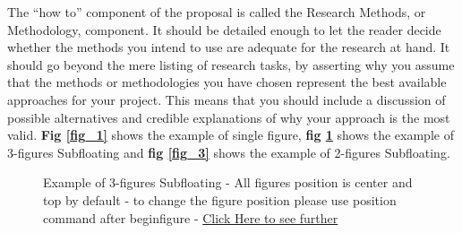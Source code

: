 The “how to” component of the proposal is called the Research Methods, or Methodology, component. It should be detailed enough to let the reader decide whether the methods you intend to use are adequate for the research at hand. It should go beyond the mere listing of research tasks, by asserting why you assume that the methods or methodologies you have chosen represent the best available approaches for your project. This means that you should include a discussion of possible alternatives and credible explanations of why your approach is the most valid. \textbf{Fig \ref{fig_1}} shows the example of single figure, \textbf{fig \ref{fig_2}} shows the example of 3-figures Subfloating and \textbf{fig \ref{fig_3}} shows the example of 2-figures Subfloating.





\begin{figure}

    \caption{\label{fig_2}Example of 3-figures Subfloating - All figures position is center and top by default - to change the figure position please use position command after begin{figure} - \href{ https://www.overleaf.com/learn/latex/Positioning_of_Figures}{Click Here to see further}}
    
\end{figure}


